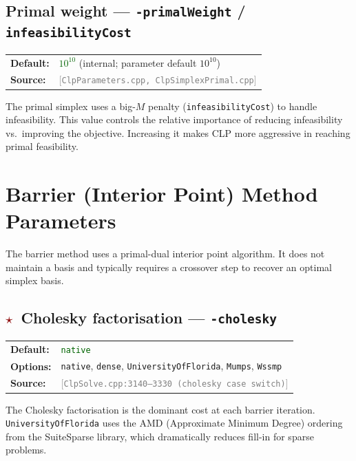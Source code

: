 \documentclass[11pt,a4paper]{article}
\newcommand{\param}[1]{\texttt{\textbf{#1}}}
\newcommand{\val}[1]{\texttt{#1}}
\newcommand{\src}[1]{\textcolor{gray}{\small[\texttt{#1}]}}
\newcommand{\default}[1]{\textcolor{darkgreen}{\texttt{#1}}}
\newcommand{\important}{\textcolor{darkred}{\textbf{$\star$}}}
\begin{document}
\subsection{Primal weight --- \param{-primalWeight} / \texttt{infeasibilityCost}}

\begin{tabular}{@{}ll@{}}
  \textbf{Default:} & \default{$10^{10}$} (internal; parameter default $10^{10}$) \\
  \textbf{Source:}  & \src{ClpParameters.cpp, ClpSimplexPrimal.cpp}
\end{tabular}

\medskip
The primal simplex uses a big-$M$ penalty (\texttt{infeasibilityCost}) to handle
infeasibility. This value controls the relative importance of reducing infeasibility
vs.\ improving the objective. Increasing it makes CLP more aggressive in reaching
primal feasibility.

\section{Barrier (Interior Point) Method Parameters}
\label{sec:barrier}

The barrier method uses a primal-dual interior point algorithm. It does not
maintain a basis and typically requires a crossover step to recover an optimal
simplex basis.

\subsection{\important\ Cholesky factorisation --- \param{-cholesky}}

\begin{tabular}{@{}ll@{}}
  \textbf{Default:} & \default{native} \\
  \textbf{Options:} & \val{native}, \val{dense}, \val{UniversityOfFlorida},
                      \val{Mumps}, \val{Wssmp} \\
  \textbf{Source:}  & \src{ClpSolve.cpp:3140--3330 (cholesky case switch)}
\end{tabular}

\medskip
The Cholesky factorisation is the dominant cost at each barrier iteration.
\val{UniversityOfFlorida} uses the AMD (Approximate Minimum Degree) ordering
from the SuiteSparse library, which dramatically reduces fill-in for
sparse problems.
\end{document}
